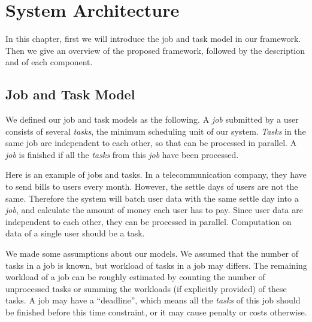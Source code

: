 \chapter{System Architecture}\label{sec:arch}

In this chapter, first we will introduce the job and task model in our
framework.
Then we give an overview of the proposed framework, followed by the
description and of each component.


\section{Job and Task Model}

We defined our job and task models as the following.
A \emph{job} submitted by a user consists of several \emph{tasks}, the
minimum scheduling unit of our system.
\emph{Tasks} in the same job are independent to each other, so that can
be processed in parallel.
A \emph{job} is finished if all the \emph{tasks} from this \emph{job} have
been processed.

Here is an example of jobs and tasks.
In a telecommunication company, they have to send bills to users every
month.
However, the settle days of users are not the same.
Therefore the system will batch user data with the same settle day into
a \emph{job}, and calculate the amount of money each user has to pay.
Since user data are independent to each other, they can be processed in
parallel.
Computation on data of a single user should be a task.

We made some assumptions about our models.
We assumed that the number of tasks in a job is known, but workload of
tasks in a job may differs.
The remaining workload of a job can be roughly estimated by counting the
number of unprocessed tasks or summing the workloads (if explicitly
provided) of these tasks.
A job may have a ``deadline'', which means all the \emph{tasks} of this
job should be finished before this time constraint, or it may cause
penalty or costs otherwise.





